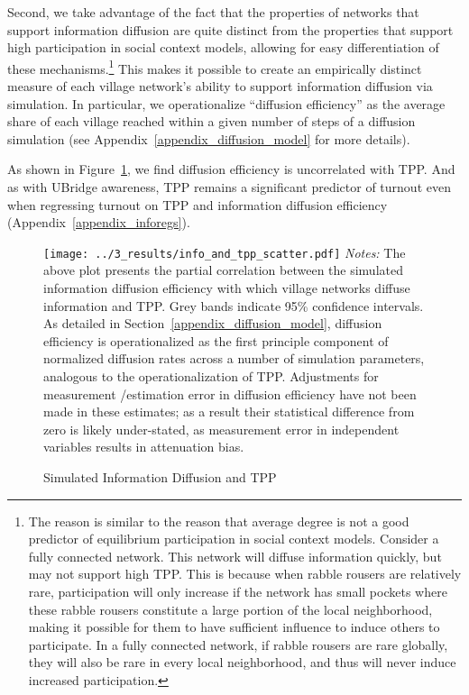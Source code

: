 \documentclass[12pt]{article}
\begin{document}
Second, we take advantage of the fact that the properties of networks that support information diffusion are quite distinct from the properties that support high participation in social context models, allowing for easy differentiation of these mechanisms.\footnote{The reason is similar to the reason that average degree is not a good predictor of equilibrium participation in social context models. Consider a fully connected network. This network will diffuse information quickly, but may not support high TPP. This is because when rabble rousers are relatively rare, participation will only increase if the network has small pockets where these rabble rousers constitute a large portion of the local neighborhood, making it possible for them to have sufficient influence to induce others to participate. In a fully connected network, if rabble rousers are rare globally, they will also be rare in every local neighborhood, and thus will never induce increased participation.} This makes it possible to create an empirically distinct measure of each village network's ability to support information diffusion via simulation. In particular, we operationalize ``diffusion efficiency'' as the average share of each village reached within a given number of steps of a diffusion simulation (see Appendix~\ref{appendix_diffusion_model} for more details).

As shown in Figure~\ref{figure_info_diffusion_turnout}, we find diffusion efficiency is uncorrelated with TPP. And as with UBridge awareness, TPP remains a significant predictor of turnout even when regressing turnout on TPP and information diffusion efficiency (Appendix~\ref{appendix_inforegs}).


\begin{figure}[!h]
    \caption{Simulated Information Diffusion and TPP}
    \label{figure_info_diffusion_turnout}
    \texttt{[image: ../3\_results/info\_and\_tpp\_scatter.pdf]}
	\scriptsize{\emph{Notes:} The above plot presents the partial correlation between the simulated information diffusion efficiency with which village networks diffuse information and TPP. Grey bands indicate 95\% confidence intervals.  As detailed in Section~\ref{appendix_diffusion_model}, diffusion efficiency is operationalized as the first principle component of normalized diffusion rates across a number of simulation parameters, analogous to the operationalization of TPP. Adjustments for measurement /estimation error in diffusion efficiency have not been made in these estimates; as a result their statistical difference from zero is likely under-stated, as measurement error in independent variables results in attenuation bias.}
\end{figure}
\end{document}
